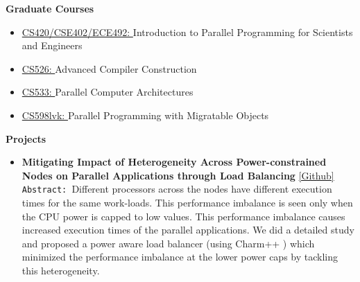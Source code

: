 \documentclass[9pt]{article}
\newenvironment{changemargin}[2]{%
  \begin{list}{}{%
    \setlength{\topsep}{0pt}%
    \setlength{\leftmargin}{#1}%
    \setlength{\rightmargin}{#2}%
    \setlength{\listparindent}{\parindent}%
    \setlength{\itemindent}{\parindent}%
    \setlength{\parsep}{\parskip}%
  }%
  \item[]}{\end{list}
}
\newenvironment{body} {
	\vspace*{-16pt}
	\begin{changemargin}{-0.25in}{-0.5in}
  }	
	{\end{changemargin}
}
\begin{document}
\begin{body}
	\vspace{14pt}
	\textbf{Graduate Courses }{} \hfill \\
	\begin{itemize} \itemsep -0pt
          \item  \href{https://cs.illinois.edu/courses/profile/CS420}{CS420/CSE402/ECE492: }
                                            Introduction to Parallel Programming for Scientists and Engineers
          \item \href{https://cs.illinois.edu/courses/profile/CS526}{CS526: }Advanced Compiler Construction
          \item \href{https://courses.engr.illinois.edu/cs533/}{CS533: }Parallel Computer Architectures
          \item \href{https://wiki.cites.illinois.edu/wiki/display/cs598lvk/Home}{CS598lvk: }Parallel Programming with Migratable Objects
	\end{itemize}
 \medskip
	\textbf{Projects}{} \hfill  \\
	\begin{itemize} \itemsep -0pt
          \item \textbf{Mitigating Impact of Heterogeneity Across Power-constrained Nodes on Parallel Applications through Load Balancing}     
                                \href{https://github.com/sdasgup3/HeterogeneityAwareLoadBalancing}{[Github]} \\
                                  \texttt{Abstract: }Different processors across the nodes
                                  have different execution times for the same
                                  work-loads. This performance imbalance is seen
                                  only when the CPU power is capped to low
                                  values. This performance imbalance causes
                                  increased execution times of the parallel
                                  applications. We did a detailed study and
                                  proposed a power aware load balancer (using
                                      Charm++ ) which minimized the performance
                                  imbalance at the lower power caps by tackling
                                  this heterogeneity.  



\end{itemize}
\end{body}
\end{document}
